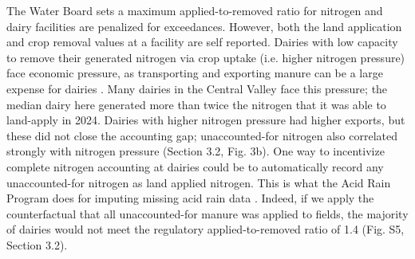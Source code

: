 \documentclass{iopjournal}
\begin{document}
The Water Board sets a maximum applied-to-removed ratio for nitrogen and dairy facilities are penalized for exceedances. However, both the land application and crop removal values at a facility are self reported. Dairies with low capacity to remove their generated nitrogen via crop uptake (i.e. higher nitrogen pressure) face economic pressure, as transporting and exporting manure can be a large expense for dairies \cite{USDA_2003}. Many dairies in the Central Valley face this pressure; the median dairy here generated more than twice the nitrogen that it was able to land-apply in 2024. Dairies with higher nitrogen pressure had higher exports, but these did not close the accounting gap; unaccounted-for nitrogen also correlated strongly with nitrogen pressure (Section 3.2, Fig. 3b). One way to incentivize complete nitrogen accounting at dairies could be to automatically record any unaccounted-for nitrogen as land applied nitrogen.  This is what the Acid Rain Program does for imputing missing acid rain data \cite{Giles_2022}. Indeed, if we apply the counterfactual that all unaccounted-for manure was applied to fields, the majority of dairies would not meet the regulatory applied-to-removed ratio of 1.4 (Fig. S5, Section 3.2). 
\end{document}
